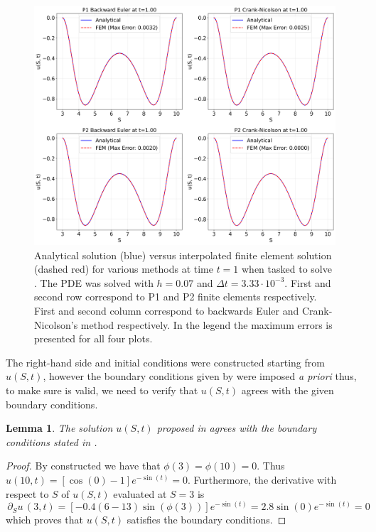 \documentclass{article}
\newtheorem{lemma}[thm]{Lemma}
\newcommand{\darg}[2]{\ensuremath{\, \partial_{#2}#1} \, }
\newcommand{\dS}[1]{\ensuremath{\darg{#1}{S}}}
\newcommand{\dSu}{\dS{u}}
\begin{document}
\begin{figure}[!ht]
    \centering
    \includegraphics[width=0.95\linewidth]{code/images/fem_vs_analytical_BlackScholesConstructedCos.png}
    \caption{Analytical solution (blue) versus interpolated finite element solution (dashed red) for various methods at time $t=1$ when tasked to solve . The PDE was solved with $h =0.07$ and $\Delta t = 3.33 \cdot 10^{-3} $. First and second row correspond to P1 and P2 finite elements respectively. First and second column correspond to backwards Euler and Crank-Nicolson's method respectively. In the legend the maximum errors is presented for all four plots.}
    \label{fig:fem_vs_true_cos}
\end{figure}

The right-hand side and initial conditions were constructed starting from $u(S,t)$, however the boundary conditions given by  were imposed \textit{a priori} thus, to make sure  is valid, we need to verify that $u(S,t)$ agrees with the given boundary conditions.
\begin{lemma}
    The solution $u(S,t)$ proposed in  agrees with the boundary conditions stated in .
\end{lemma}
\begin{proof}
    By constructed we have that $\phi(3)=\phi(10)=0$. Thus $u(10,t)=\left[\cos\left(0\right)-1\right]e^{-\sin(t)} = 0$. Furthermore, the derivative with respect to $S$ of $u(S,t)$ evaluated at $S = 3$ is
    \begin{equation*}
        \dSu(3, t) = \left[-0.4 (6 - 13) \sin(\phi(3))\right]e^{-\sin (t)} = 2.8 \sin(0)e^{-\sin (t)} = 0
    \end{equation*}
    which proves that $u(S,t)$ satisfies the boundary conditions.
\end{proof}
\end{document}
